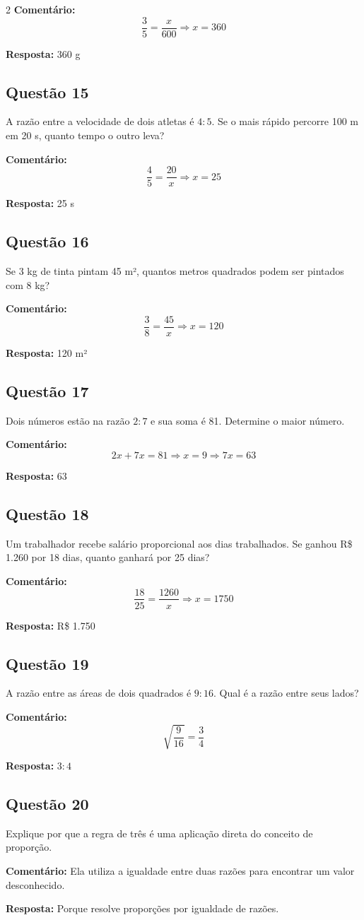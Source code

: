 \documentclass[11pt]{article}
\begin{document}
\begin{multicols}{2}
\textbf{Comentário:}
\[
\frac{3}{5} = \frac{x}{600}
\Rightarrow x = 360
\]

\textbf{Resposta:} 360 g

\subsection*{Questão 15}
A razão entre a velocidade de dois atletas é $4:5$. Se o mais rápido percorre 100 m em 20 s, quanto tempo o outro leva?

\textbf{Comentário:}
\[
\frac{4}{5} = \frac{20}{x}
\Rightarrow x = 25
\]

\textbf{Resposta:} 25 s

\subsection*{Questão 16}
Se 3 kg de tinta pintam 45 m², quantos metros quadrados podem ser pintados com 8 kg?

\textbf{Comentário:}
\[
\frac{3}{8} = \frac{45}{x}
\Rightarrow x = 120
\]

\textbf{Resposta:} 120 m²

\subsection*{Questão 17}
Dois números estão na razão $2:7$ e sua soma é 81. Determine o maior número.

\textbf{Comentário:}
\[
2x + 7x = 81
\Rightarrow x = 9
\Rightarrow 7x = 63
\]

\textbf{Resposta:} 63

\subsection*{Questão 18}
Um trabalhador recebe salário proporcional aos dias trabalhados. Se ganhou R\$ 1.260 por 18 dias, quanto ganhará por 25 dias?

\textbf{Comentário:}
\[
\frac{18}{25} = \frac{1260}{x}
\Rightarrow x = 1750
\]

\textbf{Resposta:} R\$ 1.750

\subsection*{Questão 19}
A razão entre as áreas de dois quadrados é $9:16$. Qual é a razão entre seus lados?

\textbf{Comentário:}
\[
\sqrt{\frac{9}{16}} = \frac{3}{4}
\]

\textbf{Resposta:} $3:4$

\subsection*{Questão 20}
Explique por que a regra de três é uma aplicação direta do conceito de proporção.

\textbf{Comentário:}
Ela utiliza a igualdade entre duas razões para encontrar um valor desconhecido.

\textbf{Resposta:} Porque resolve proporções por igualdade de razões.

\end{multicols}
\end{document}
